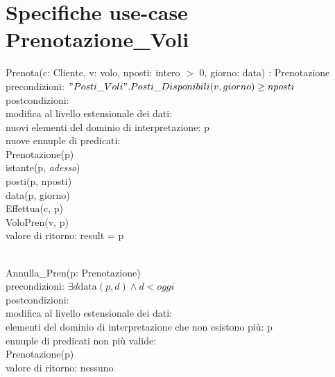 \documentclass[a4paper,12pt]{report}
\begin{document}
      \section{Specifiche use-case Prenotazione\_Voli}
        \hspace*{1cm}Prenota(c: Cliente, v: volo, nposti: intero $>$ 0, giorno: data) : Prenotazione \\
        \hspace*{2cm}precondizioni: $"Posti\_Voli".Posti\_Disponibili(v, giorno) \geq nposti$ \\
        \hspace*{2cm}postcondizioni: \\
        \hspace*{3cm}modifica al livello estensionale dei dati: \\
        \hspace*{4cm}nuovi elementi del dominio di interpretazione: p \\
        \hspace*{4cm}nuove ennuple di predicati: \\
        \hspace*{5cm}Prenotazione(p) \\
        \hspace*{5cm}istante(p, \textit{adesso}) \\
        \hspace*{5cm}posti(p, nposti) \\
        \hspace*{5cm}data(p, giorno) \\
        \hspace*{5cm}Effettua(c, p) \\
        \hspace*{5cm}VoloPren(v, p) \\
        \hspace*{3cm}valore di ritorno: result = p \\ \\

        \newpage

        \hspace*{1cm}Annulla\_Pren(p: Prenotazione) \\
        \hspace*{2cm}precondizioni: $\exists d \text{data}(p, d) \wedge d < \textit{oggi}$ \\
        \hspace*{2cm}postcondizioni: \\
        \hspace*{3cm}modifica al livello estensionale dei dati: \\
        \hspace*{4cm}elementi del dominio di interpretazione che non esistono più: p \\
        \hspace*{4cm}ennuple di predicati non più valide: \\
        \hspace*{5cm}Prenotazione(p) \\
        \hspace*{3cm}valore di ritorno: nessuno \\ \\
\end{document}
